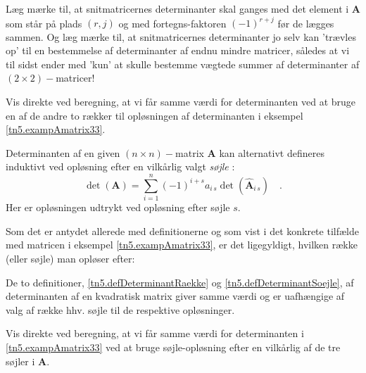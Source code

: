 \begin{obs}
Læg mærke til, at snitmatricernes determinanter skal ganges med det element i $\mathbf{A}$ som står på plads $(r,j)$ og med fortegns-faktoren $(-1)^{r+j}$ før de lægges sammen. Og læg mærke til, at snitmatricernes determinanter jo selv kan 'trævles op' til en bestemmelse af determinanter af endnu mindre matricer, således at vi til sidst ender med 'kun' at skulle bestemme vægtede summer af determinanter af $(2 \times 2)-$matricer!
\end{obs}


\begin{exercise} \label{tn5.exercAlterOpl}
Vis direkte ved beregning, at vi får samme værdi for determinanten ved at bruge en af de andre to rækker til opløsningen af determinanten i eksempel \ref{tn5.exampAmatrix33}.
\end{exercise}

\begin{definition} \label{tn5.defDeterminantSoejle}
Determinanten af en given $(n \times n)-$matrix $\mathbf{A}$ kan alternativt defineres induktivt ved
opløsning efter en vilkårlig valgt \textit{søjle} :
\begin{equation} \label{tn5.eqDeterminantSoejle}
\det(\mathbf{A}) = \sum_{i=1}^{n}(-1)^{i+s}a_{i\,s}\det(\widehat{\mathbf{A}}_{i\,s}) \quad .
\end{equation}
Her er opløsningen udtrykt ved opløsning efter søjle $s$.
\end{definition}

Som det er antydet allerede med definitionerne og som vist i det konkrete tilfælde med matricen i eksempel \ref{tn5.exampAmatrix33}, er det ligegyldigt, hvilken række (eller søjle) man opløser efter:

\begin{theorem}
De to definitioner, \ref{tn5.defDeterminantRaekke} og \ref{tn5.defDeterminantSoejle}, af determinanten af en kvadratisk matrix giver samme værdi og er uafhængige af valg af række hhv. søjle til de respektive opløsninger.
\end{theorem}

\begin{exercise}
Vis direkte ved beregning, at vi får samme værdi for determinanten i \ref{tn5.exampAmatrix33} ved at bruge søjle-opløsning efter en vilkårlig af de tre søjler i $\mathbf{A}$.
\end{exercise}

